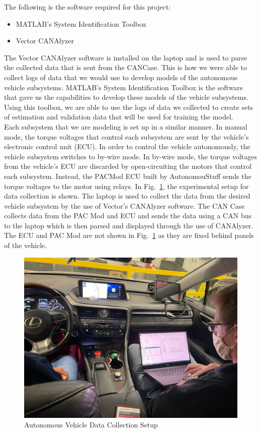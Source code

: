 \documentclass[journal,twoside,web]{ieeecolor}
\begin{document}
	\noindent The following is the software required for this project: 
	\begin{itemize}
    		\item MATLAB's System Identification Toolbox 
    		\item Vector CANAlyzer 
 	\end{itemize}
 	
 	
\noindent The Vector CANAlyzer software is installed on the laptop and is used to parse the collected data that is sent from the CANCase. This is how we were able to collect logs of data that we would use to develop models of the autonomous vehicle subsystems. MATLAB's System Identification Toolbox is the software that gave us the capabilities to develop these models of the vehicle subsystems. Using this toolbox, we are able to use the logs of data we collected to create sets of estimation and validation data that will be used for training the model.
\\

Each subsystem that we are modeling is set up in a similar manner. In manual mode, the torque voltages that control each subsystem are sent by the vehicle's electronic control unit (ECU). In order to control the vehicle autonomously, the vehicle subsystem switches to by-wire mode. In by-wire mode, the torque voltages from the vehicle's ECU are discarded by open-circuiting the motors that control each subsystem. Instead, the PACMod ECU built by AutonomouStuff sends the torque voltages to the motor using relays. In Fig.~\ref{fig:vehicleSetup}, the experimental setup for data collection is shown. The laptop is used to collect the data from the desired vehicle subsystem by the use of Vector's CANAlyzer software. The CAN Case collects data from the PAC Mod and ECU and sends the data using a CAN bus to the laptop which is then parsed and displayed through the use of CANAlyzer. The ECU and PAC Mod are not shown in Fig.~\ref{fig:vehicleSetup} as they are fixed behind panels of the vehicle. 
\\



\begin{figure}[htbp]
	\centering
    	\includegraphics[width=.48\textwidth]{figs/img/picturesVisitToAStuff/dataColletionSetup1-20211007}
    	\caption{Autonomous Vehicle Data Collection Setup}
    	\label{fig:vehicleSetup}
\end{figure}
\end{document}
